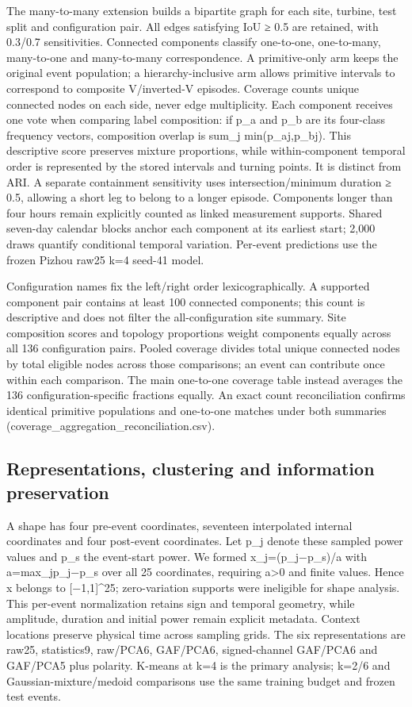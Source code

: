 \documentclass[preprint,12pt]{elsarticle}
\begin{document}
The many-to-many extension builds a bipartite graph for each site, turbine, test split and configuration pair. All edges satisfying IoU ≥ 0.5 are retained, with 0.3/0.7 sensitivities. Connected components classify one-to-one, one-to-many, many-to-one and many-to-many correspondence. A primitive-only arm keeps the original event population; a hierarchy-inclusive arm allows primitive intervals to correspond to composite V/inverted-V episodes. Coverage counts unique connected nodes on each side, never edge multiplicity. Each component receives one vote when comparing label composition: if p\_a and p\_b are its four-class frequency vectors, composition overlap is sum\_j min(p\_aj,p\_bj). This descriptive score preserves mixture proportions, while within-component temporal order is represented by the stored intervals and turning points. It is distinct from ARI. A separate containment sensitivity uses intersection/minimum duration ≥ 0.5, allowing a short leg to belong to a longer episode. Components longer than four hours remain explicitly counted as linked measurement supports. Shared seven-day calendar blocks anchor each component at its earliest start; 2,000 draws quantify conditional temporal variation. Per-event predictions use the frozen Pizhou raw25 k=4 seed-41 model.

Configuration names fix the left/right order lexicographically. A supported component pair contains at least 100 connected components; this count is descriptive and does not filter the all-configuration site summary. Site composition scores and topology proportions weight components equally across all 136 configuration pairs. Pooled coverage divides total unique connected nodes by total eligible nodes across those comparisons; an event can contribute once within each comparison. The main one-to-one coverage table instead averages the 136 configuration-specific fractions equally. An exact count reconciliation confirms identical primitive populations and one-to-one matches under both summaries (coverage\_aggregation\_reconciliation.csv).

\subsection{Representations, clustering and information preservation}\label{representations-clustering-and-information-preservation}

A shape has four pre-event coordinates, seventeen interpolated internal coordinates and four post-event coordinates. Let p\_j denote these sampled power values and p\_s the event-start power. We formed x\_j=(p\_j−p\_s)/a with a=max\_j\textbar p\_j−p\_s\textbar{} over all 25 coordinates, requiring a\textgreater0 and finite values. Hence x belongs to {[}−1,1{]}\^{}25; zero-variation supports were ineligible for shape analysis. This per-event normalization retains sign and temporal geometry, while amplitude, duration and initial power remain explicit metadata. Context locations preserve physical time across sampling grids. The six representations are raw25, statistics9, raw/PCA6, GAF/PCA6, signed-channel GAF/PCA6 and GAF/PCA5 plus polarity. K-means at k=4 is the primary analysis; k=2/6 and Gaussian-mixture/medoid comparisons use the same training budget and frozen test events.
\end{document}
